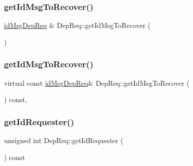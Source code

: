 \mbox{\label{classDepReq_abbf56cc3e6a0be7ff696f9216f51f968}} 
\subsubsection{\texorpdfstring{get\+Id\+Msg\+To\+Recover()}{getIdMsgToRecover()}\hspace{0.1cm}{\footnotesize\ttfamily [1/2]}}
{\footnotesize\ttfamily \hyperlink{depReq__m_8h_a2bbb71ed0e9660ec02d81471eafd9c29}{id\+Msg\+Dep\+Req} \& Dep\+Req\+::get\+Id\+Msg\+To\+Recover (\begin{DoxyParamCaption}{ }\end{DoxyParamCaption})\hspace{0.3cm}{\ttfamily [virtual]}}

\mbox{\label{classDepReq_ab173923214b88b6c4b2f1d1cee8313d0}} 
\subsubsection{\texorpdfstring{get\+Id\+Msg\+To\+Recover()}{getIdMsgToRecover()}\hspace{0.1cm}{\footnotesize\ttfamily [2/2]}}
{\footnotesize\ttfamily virtual const \hyperlink{depReq__m_8h_a2bbb71ed0e9660ec02d81471eafd9c29}{id\+Msg\+Dep\+Req}\& Dep\+Req\+::get\+Id\+Msg\+To\+Recover (\begin{DoxyParamCaption}{ }\end{DoxyParamCaption}) const\hspace{0.3cm}{\ttfamily [inline]}, {\ttfamily [virtual]}}

\mbox{\label{classDepReq_a68f528e65d1529da94226f8a83483d6c}} 
\subsubsection{\texorpdfstring{get\+Id\+Requester()}{getIdRequester()}}
{\footnotesize\ttfamily unsigned int Dep\+Req\+::get\+Id\+Requester (\begin{DoxyParamCaption}{ }\end{DoxyParamCaption}) const\hspace{0.3cm}{\ttfamily [virtual]}}


